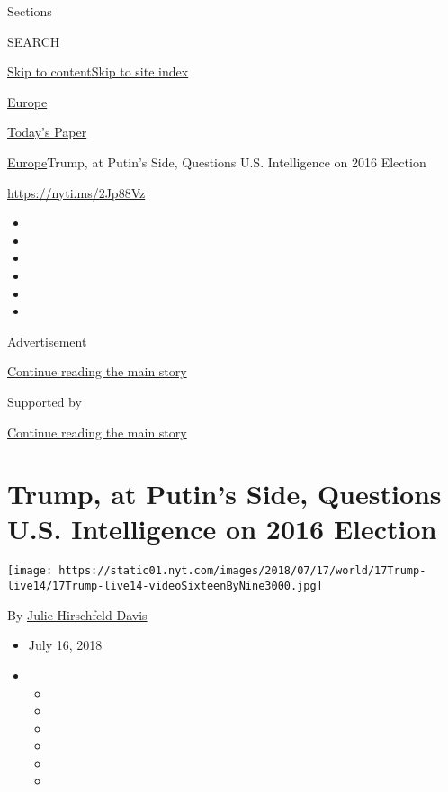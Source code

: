 Sections

SEARCH

\protect\hyperlink{site-content}{Skip to
content}\protect\hyperlink{site-index}{Skip to site index}

\href{https://www.nytimes.com/section/world/europe}{Europe}

\href{https://myaccount.nytimes.com/auth/login?response_type=cookie\&client_id=vi}{}

\href{https://www.nytimes.com/section/todayspaper}{Today's Paper}

\href{/section/world/europe}{Europe}\textbar{}Trump, at Putin's Side,
Questions U.S. Intelligence on 2016 Election

\url{https://nyti.ms/2Jp88Vz}

\begin{itemize}
\item
\item
\item
\item
\item
\item
\end{itemize}

Advertisement

\protect\hyperlink{after-top}{Continue reading the main story}

Supported by

\protect\hyperlink{after-sponsor}{Continue reading the main story}

\hypertarget{trump-at-putins-side-questions-us-intelligence-on-2016-election}{%
\section{Trump, at Putin's Side, Questions U.S. Intelligence on 2016
Election}\label{trump-at-putins-side-questions-us-intelligence-on-2016-election}}

\texttt{[image: https://static01.nyt.com/images/2018/07/17/world/17Trump-live14/17Trump-live14-videoSixteenByNine3000.jpg]}

By \href{https://www.nytimes.com/by/julie-hirschfeld-davis}{Julie
Hirschfeld Davis}

\begin{itemize}
\item
  July 16, 2018
\item
  \begin{itemize}
  \item
  \item
  \item
  \item
  \item
  \item
  \end{itemize}
\end{itemize}

